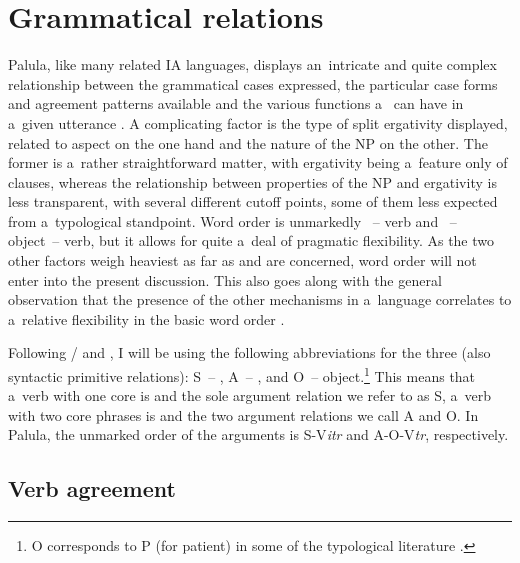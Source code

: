 \chapter{Grammatical relations}
\label{chap:11}

Palula, like many related IA languages, displays an~intricate and quite complex relationship between the grammatical cases expressed, the particular case forms and agreement patterns available and the various functions a~  can have in a~given utterance \citep[230--231]{masica1991}. A complicating factor is the type of split ergativity displayed, related to aspect on the one hand and the nature of the NP on the other. The former is a~rather straightforward matter, with ergativity being a~feature only of  clauses, whereas the relationship between properties of the NP and ergativity is less transparent, with several different cutoff points, some of them less expected from a~typological standpoint. Word order is unmarkedly  ~-- verb and  ~-- object~-- verb, but it allows for quite a~deal of pragmatic flexibility. As the two other factors weigh heaviest as far as  and  are concerned, word order will not enter into the present discussion. This also goes along with the general observation that the presence of the other mechanisms in a~language correlates to a~relative flexibility in the basic word order \citep[14--15]{blake2001}.



Following \citet[6--8]{dixon1994}/\citet[76--77]{dixon2010} and \citet[402]{bickel2011}, I will be using the following abbreviations for the three  (also syntactic primitive relations): S~--  , A~--  , and O~--  object.\footnote{O corresponds to P (for patient) in some of the typological literature \citep{comrie1989,croft2003}.\par } This means that a~verb with one core   is  and the sole argument relation we refer to as S, a~verb with two core  phrases is  and the two argument relations we call A and O. In Palula, the unmarked order of the arguments is S-V\textit{itr} and A-O-V\textit{tr}, respectively.


\section{Verb agreement}
\label{sec:11-1}

